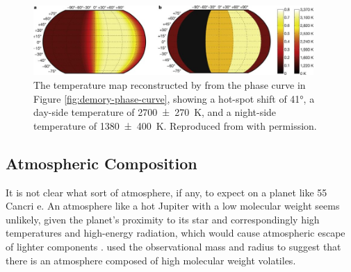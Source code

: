 \begin{figure}
  \centering
  \includegraphics[width=0.95\textwidth]{figures/linking-climate-55cnce/demory-temp-maps.jpg}
\caption{The temperature map reconstructed by \citet{demory201655cnce} from the phase curve in Figure \ref{fig:demory-phase-curve}, showing a hot-spot shift of \ang{41}, a day-side temperature of \SI[separate-uncertainty = true]{2700(270)}{\kelvin}, and a night-side temperature of \SI[separate-uncertainty = true]{1380(400)}{\kelvin}. Reproduced from \citet{demory201655cnce} with permission.}\label{fig:demory-temp-maps}
\end{figure}

\subsection{Atmospheric Composition}

It is not clear what sort of atmosphere, if any, to expect on a planet like 55 Cancri e. An atmosphere like a hot Jupiter with a low molecular weight seems unlikely, given the planet's proximity to its star and correspondingly high temperatures and high-energy radiation, which would cause atmospheric escape of lighter components \citep{demory201655cnce}. \citet{gillon2012improved} used the observational mass and radius to suggest that there is an atmosphere composed of high molecular weight volatiles.

